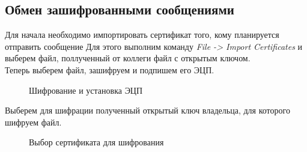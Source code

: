 \documentclass[10pt,a4paper]{report}
\begin{document}
\subsection{Обмен зашифрованными сообщениями}
Для начала необходимо импортировать сертификат того, кому планируется отправить сообщение Для этого выполним команду \textit{File -> Import Certificates} и выберем файл, поллученный от коллеги файл с открытым ключом.\\
Теперь выберем файл, зашифруем и подпишем его ЭЦП.\\
\begin{figure}[h]	
\caption{Шифрование и установка ЭЦП}
\label{ris:image9}
\end{figure}
Выберем для шифрации полученный открытый ключ владельца, для которого шифруем файл.
\begin{figure}[h]	
\caption{Выбор сертификата для шифрования}
\label{ris:image10}
\end{figure}
\end{document}
